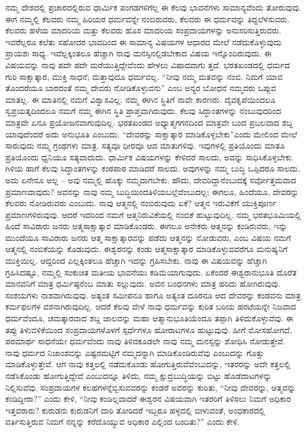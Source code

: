 ನಮ್ಮ ದೇಶದಲ್ಲಿ ಪ್ರಚಾರದಲ್ಲಿರುವ ಧಾರ್ಮಿಕ ಪಂಗಡಗಳಿಗೆಲ್ಲ ಈ ಕೆಲವು ಭಾವನೆಗಳು ಸಾಮಾನ್ಯವೆಂದು ತೋರುವುವು. ಈಗ ನಮ್ಮಲ್ಲಿ ಕೆಲವರು ನಮ್ಮ ಹಿರಿಯರ ಧರ್ಮವನ್ನೇ ನಂಬಿರುವರು, ಕೆಲವರು ಈ ಧರ್ಮವನ್ನು ತಿದ್ದಲೆಳಸುವರು. ಕೆಲವರು ಹಳೆಯ ಮಾದರಿಯ ಮತ್ತು ಕೆಲವರು ಹೊಸ ಮಾದರಿಯ ಸಂಪ್ರದಾಯಗಳನ್ನು ಅನುಸರಿಸುತ್ತಿರುವರು. ಇವರೆಲ್ಲರೂ ಕಲೆತು ಸಹೋದರ ಭಾವದಿಂದ ಈ ಸಾಮಾನ್ಯ ವಿಷಯಗಳ ಆಧಾರದ ಮೇಲೆ ನಡೆದುಕೊಳ್ಳುವುದು ಪ್ರಾಯಶಃ ಸಾಧ್ಯ. ಇವೆಲ್ಲಕ್ಕಿಂತಲೂ ಹೆಚ್ಚಾಗಿ ನಾವು ಮನಸ್ಸಿನಲ್ಲಿಡಬೇಕಾದ ವಿಷಯ ಇನ್ನೊಂದಿರುವುದು. ಈ ವಿಷಯವನ್ನು ನಾವು ಪದೇ ಪದೇ ಮರೆಯುತ್ತಿದ್ದೇವೆಂದು ಹೇಳಲು ವಿಷಾದವಾಗು ತ್ತದೆ. ಭರತಖಂಡದಲ್ಲಿ ಧರ್ಮದ ಗುರಿ ಸಾಕ್ಷಾತ್ಕಾರ, ಮುಕ್ತಿ ಸಾಧನೆ; ಮತ್ತಾವುದೂ ಧರ್ಮವಲ್ಲ. “ನೀವು ನಮ್ಮ ಮತವನ್ನು ನಂಬಿ. ನಿಮಗೆ ಯಾವ ತೊಂದರೆಯೂ ಬಾರದಂತೆ ನಮ್ಮ ದೇವರು ನೋಡಿಕೊಳ್ಳುವನು” ಎಂಬ ಅನ್ಯರ ಬೋಧನೆ ನಮ್ಮವರು ಒಪ್ಪುವ ಮಾತಲ್ಲ. ಈ ಮಾತಿನಲ್ಲಿ ನಮಗೆ ವಿಶ್ವಾಸವಿಲ್ಲ. ನಮ್ಮ ಈಗಿನ ಸ್ಥಿತಿಗೆ ನಾವೇ ಕಾರಣರು. ದೈವಕೃಪೆಯಿಂದಲೂ ಸ್ವಪ್ರಯತ್ನದಿಂದಲೂ ನಮಗೆ ನಮ್ಮ ಈಗಿನ ಸ್ಥಿತಿ ಪ್ರಾಪ್ತವಾಗಿರುವುದು. ಕೆಲವು ಸಿದ್ಧಾಂತಗಳನ್ನು ನಂಬುವುದರಿಂದ ಮಾತ್ರವೇ ಏನೂ ಪ್ರಯೋಜನವಾಗುವುದಿಲ್ಲ. ಭರತಖಂಡದ ಅಧ್ಯಾತ್ಮಗಗನದಿಂದ ಮಾತ್ರವೇ ಬಂದ ಪ್ರಬಲವಾದ ಶಬ್ದ ಯಾವುದೆಂದರೆ ಅದು ಅನುಭೂತಿ ಎಂಬುದು. “ದೇವರನ್ನು ಸಾಕ್ಷಾತ್ಕಾರ ಮಾಡಿಕೊಳ್ಳಬೇಕು”ಎಂದು ಮೇಲಿಂದ ಮೇಲೆ ಸಾರುವುದು ನಮ್ಮ ಗ್ರಂಥಗಳು ಮಾತ್ರ. ಸತ್ಯವೂ ಧೀರವೂ ಆದ ಮಾತುಗಳಿವು. ಇವುಗಳಲ್ಲಿ ಪ್ರತಿಯೊಂದು ಮಾತೂ ಪ್ರತಿಯೊಂದು ಧ್ವನಿಯೂ ಸತ್ಯವಾದುದು. ಧಾರ್ಮಿಕ ವಿಷಯಗಳನ್ನು ಕೇಳಿದರೆ ಸಾಲದು, ಅವನ್ನು ಸಾಧಿಸಿಕೊಳ್ಳಬೇಕು. ಗಿಳಿಯ ಹಾಗೆ ಕೆಲವು ಸಿದ್ಧಾಂತಗಳನ್ನು ಕಂಠಪಾಠ ಮಾಡಿದರೆ ಸಾಲದು. ಅವುಗಳನ್ನು ನಮ್ಮ ಬುದ್ಧಿ ಒಪ್ಪಿದರೂ ಸಾಲದು. ಅದು ಏನೇನೂ ಅಲ್ಲ – ಅವು ನಮ್ಮಲ್ಲಿ ಹೊಕ್ಕು ನಮ್ಮದಾಗಬೇಕು. ಹೌದು, ದೇವರಿದ್ದಾನೆಂಬುದಕ್ಕೆ ಸರ್ವೋತ್ತಮವಾದ ಪ್ರಮಾಣವಾವುದು? ಅವನನ್ನು ನಾವು ನಮ್ಮ ಬುದ್ಧಿಯಿಂದ\break ತಿಳಿಯಬಲ್ಲೆವೆಂಬುದಲ್ಲ; ಈಗಲೂ, ಹಿಂದೆಯೂ, ದೇವರನ್ನು ಕೆಲವರು ನೋಡಿರುವರು ಎಂಬುದು. ನಾವು ಆತ್ಮನಲ್ಲಿ ನಂಬಿರುವುದು ಏಕೆ? ಆತ್ಮನ ಇರುವಿಕೆಗೆ ಯುಕ್ತಿಪೂರ್ಣ ಪ್ರಮಾಣಗಳಿರುವುವು. ಆದರೆ ಇದರಿಂದ ನಮಗೆ ಆತ್ಮನಿರುವಿಕೆಯಲ್ಲಿ ನಂಬಿಕೆ ಹುಟ್ಟುವುದಿಲ್ಲ. ನಮ್ಮ ಭರತಭೂಮಿಯಲ್ಲಿ ಹಿಂದೆ ಸಾವಿರಾರು ಜನರು ಆತ್ಮಸಾಕ್ಷಾತ್ಕಾರ ಮಾಡಿಕೊಂಡರು. ಈಗಲೂ ಅನೇಕರು ಆತ್ಮನನ್ನು ಕಂಡಿರುವರು, ಇನ್ನು ಮುಂದೆಯೂ ಸಾವಿರಾರು ಜನರು ಆತ್ಮ ಸಾಕ್ಷಾತ್ಕಾರವನ್ನು ಪಡೆದು ಆತ್ಮನನ್ನು ನೋಡುವರು, ಎಂಬ ವಿಷಯ ನಮಗೆ ಆತ್ಮನಲ್ಲಿ ನಂಬಿಕೆಯನ್ನು ಕೊಡುವುದು. ಈಶ್ವರನನ್ನು ಕಂಡು ಆತ್ಮಸಾಕ್ಷಾತ್ಕಾರ ಮಾಡಿಕೊಳ್ಳುವವರೆಗೂ ಮನುಷ್ಯನಿಗೆ ಮುಕ್ತಿಯಿಲ್ಲ. ಆದ್ದರಿಂದ ಎಲ್ಲಕ್ಕಿಂತಲೂ ಹೆಚ್ಚಾಗಿ ಇದನ್ನು ಗ್ರಹಿಸಬೇಕು. ನಾವು ಈ ವಿಷಯವನ್ನು ಹೆಚ್ಚಾಗಿ ಗ್ರಹಿಸಿದಷ್ಟೂ, ನಮ್ಮಲ್ಲಿ ಸಂಕುಚಿತ ಮತೀಯ ಭಾವನೆಯು ಕಡಿಮೆಯಾಗುವುದು. ಏಕೆಂದರೆ ಈಶ್ವರಾನುಭೂತಿ ದೊರೆತ ಮಾನವನಿಗೆ ಮಾತ್ರ ಧರ್ಮಿಷ್ಠನೆಂಬ ಮಾತು ಸಲ್ಲುವುದು. ಅವನ ಬಂಧನಗಳು ಮಾತ್ರ ಹರಿದು ಹೋಗಿರುವುವು. ಸಂಶಯಗಳು ನಾಶವಾಗಿರುವುವು. ಅತ್ಯಂತ ಸಮೀಪನೂ ಹಾಗೂ ಅತ್ಯಂತ ದೂರನೂ ಆದ ದೇವರನ್ನು ಕಂಡವನು ಮಾತ್ರ ಕರ್ಮಫಲಗಳ ವಶನಾಗಿರುವುದಿಲ್ಲ. ಆದರೆ ಕೆಲವು ವೇಳೆ ನಾವು ಧರ್ಮವನ್ನು ಕುರಿತ ಬರಿಯ ಹರಟೆಯನ್ನೇ ನಿಜವಾದ ಧರ್ಮವೆಂದೂ, ಚಮತ್ಕಾರವಾದ ಶಬ್ದ ಜಾಲವನ್ನು ಮಹಾ ಆತ್ಮಾನುಭೂತಿಯೆಂದೂ ತಪ್ಪಾಗಿ ತಿಳಿದುಕೊಳ್ಳುವೆವು. ಈ ತಪ್ಪು ತಿಳುವಳಿಕೆಯಿಂದ ಸಂಪ್ರದಾಯಗಳೊಳಗೆ ಸ್ಪರ್ಧೆಗಳೂ ಹೋರಾಟಗಳೂ ಹುಟ್ಟುವುವು. ಹೀಗೆ ಮೋಸಹೋಗದೆ, ಪರಮಾರ್ಥ ಸಾಧನೆಯೇ ಧರ್ಮವೆಂದು ನಾವು ತಿಳಿದಕೂಡಲೇ ನಾವು ನಮ್ಮ ಮನಸ್ಸನ್ನು ಶೋಧಿಸಿ ನೋಡುತ್ತೇವೆ. ನಾವು ಧರ್ಮದ ನಿಜಾಂಶವನ್ನು ಎಷ್ಟರಮಟ್ಟಿಗೆ ನಮ್ಮದನ್ನಾಗಿ ಮಾಡಿಕೊಂಡಿರುವೆವು ಎಂಬುದನ್ನು ಗೊತ್ತು ಮಾಡಿಕೊಳ್ಳುತ್ತೇವೆ. ಆಗ ನಾವು ಕತ್ತಲಲ್ಲಿ ನಡೆದುಕೊಂಡು ಹೋಗುತ್ತಿರುವೆವೆಂಬುದನ್ನು, ಇತರರನ್ನು ಅದೇ ಕತ್ತಲಲ್ಲಿ ನಡೆಸಿಕೊಂಡು ಹೋಗುತ್ತಿದ್ದೇವೆ ಎಂಬುದನ್ನೂ ತಿಳಿದು, ನಮ್ಮ ಕ್ಷುದ್ರಬುದ್ಧಿಯನ್ನು ಬಿಟ್ಟು ಹೊಡೆದಾಟಗಳನ್ನು ನಿಲ್ಲಿಸುವೆವು. ಸಂಪ್ರದಾಯಗಳ ಕಲಹಗಳನ್ನೆಬ್ಬಿಸುವವರನ್ನು ಕಂಡರೆ ಅವರನ್ನು ಕುರಿತು, “ನೀವು ದೇವರನ್ನು, ಆತ್ಮವನ್ನು ಕಂಡಿದ್ದೀರಾ?” ಎಂದು ಕೇಳಿ, “ನೀವು ಕಂಡಿಲ್ಲವಾದರೆ ಈಶ್ವರನ ವಿಷಯವಾಗಿ ಇತರರಿಗೆ ತಿಳಿಸಲು ನಿಮಗೆ ಅಧಿಕಾರ ಇತ್ತವರಾರು? ಕುರುಡನು ಕುರುಡನಿಗೆ ದಾರಿ ತೋರಿದರೆ ಇಬ್ಬರೂ ಹಳ್ಳದಲ್ಲಿ ಬೀಳುವಂತೆ, ಅಂಧಕಾರದಲ್ಲಿ ವರ್ತಿಸುತ್ತಿರುವ ನಿಮಗೆ ನನ್ನನ್ನು ಕರೆದೊಯ್ಯುವ ಅಧಿಕಾರ ಎಲ್ಲಿಂದ ಬಂದಿತು?” ಎಂದು ಕೇಳಿ. 

